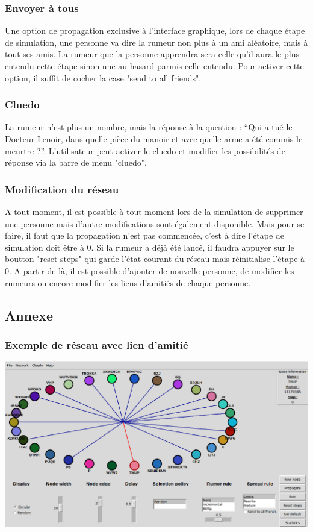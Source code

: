 \documentclass[a4paper,11pt]{article}
\begin{document}
{\subsubsection {Envoyer à tous}
{Une option de propagation exclusive à l'interface graphique, lors de chaque étape de simulation, une personne va dire la rumeur non plus 
à un ami aléatoire, mais à tout ses amis. La rumeur que la personne apprendra sera celle qu'il aura le plus entendu cette étape sinon une au hasard 
parmis celle entendu. Pour activer cette option, il suffit de cocher la case "send to all friends".}
\subsubsection {Cluedo}
{La rumeur n'est plus un nombre, mais la réponse à la question : “Qui a tué le Docteur Lenoir, dans quelle pièce du manoir et avec quelle arme a été commis le
meurtre ?”. L'utilisateur peut activer le cluedo et modifier les possibilités de réponse via la barre de menu "cluedo".}
\subsubsection {Modification du réseau}
{A tout moment, il est possible à tout moment lors de la simulation de supprimer une personne mais d'autre modifications sont également disponible.
Mais pour se faire, il faut que la propagation n'est pas commencée, c'est à dire l'étape de simulation doit être à 0. Si la rumeur a déjà été lancé, 
il faudra appuyer sur le boutton "reset steps" qui garde l'état courant du réseau mais réinitialise l'étape à 0. A partir de là,
il est possible d'ajouter de nouvelle personne, de modifier les rumeurs ou encore modifier les liens d'amitiés de chaque personne.}

\subsection{Annexe}
\subsubsection{Exemple de réseau avec lien d'amitié}
\includegraphics[width=17cm]{ReseauSimple.png}
}
\end{document}
